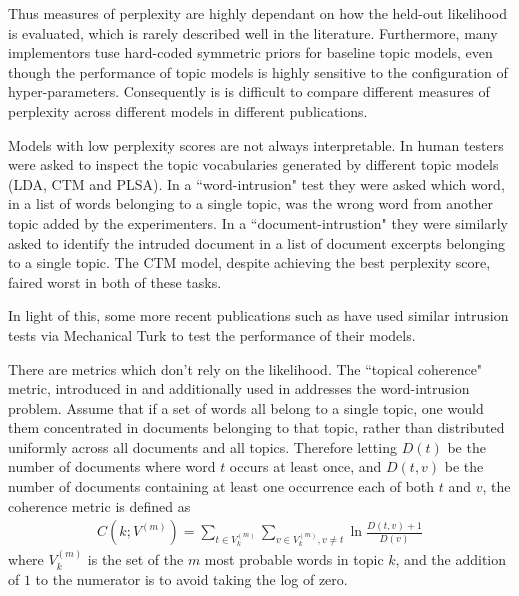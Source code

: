 Thus measures of perplexity are highly dependant on how the held-out likelihood is evaluated, which is rarely described well in the literature. Furthermore, many implementors tuse hard-coded symmetric priors for baseline topic models, even though the performance of topic models is highly sensitive to the configuration of hyper-parameters\cite{Asuncion2012}\cite{Wallach2006}. Consequently is is difficult to compare different measures of perplexity across different models in different publications.

Models with low perplexity scores are not always interpretable. In\cite{Chang2009} human testers were asked to inspect the topic vocabularies generated by different topic models (LDA, CTM and PLSA). In a ``word-intrusion" test they were asked which word, in a list of words belonging to a single topic, was the wrong word from another topic added by the experimenters. In a ``document-intrustion" they were similarly asked to identify the intruded document in a list of document excerpts belonging to a single topic. The CTM model, despite achieving the best perplexity score, faired worst in both of these tasks. 


In light of this, some more recent publications such as \cite{Li2006}\cite{Wang2007}\cite{Lindsey2012} have used similar intrusion tests via Mechanical Turk to test the performance of their models.

There are metrics which don't rely on the likelihood. The ``topical coherence" metric, introduced in \cite{Mimno2011} and additionally used in \cite{Mimno2012a} addresses the word-intrusion problem. Assume that if a set of words all belong to a single topic, one would them concentrated in documents belonging to that topic, rather than distributed uniformly across all documents and all topics. Therefore letting $D(t)$ be the number of documents where word $t$ occurs at least once, and $D(t,v)$ be the number of documents containing at least one occurrence each of both $t$ and $v$, the coherence metric is defined as
\begin{align}
C(k; V^{(m)}) = \sum_{t \in V^{(m)}_k} \sum_{v \in V^{(m)}_k,  v \neq t} \ln \frac{D(t, v) + 1}{D(v)}
\end{align}
where $V^{(m)}_k$ is the set of the $m$ most probable words in topic $k$, and the addition of $1$ to the numerator is to avoid taking the log of zero. 

